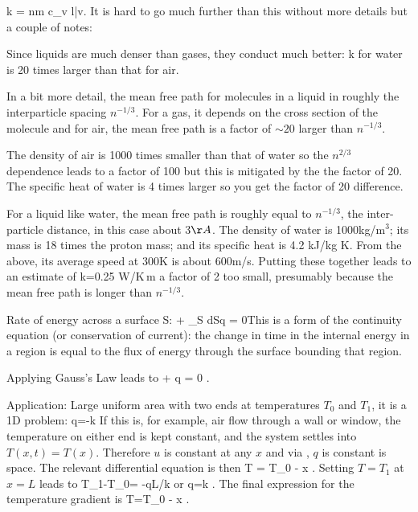 \documentclass[11pt]{book}
\begin{document}
%


\be
k =  nm c_v l\bar v.\ee
It is hard to go much further than this without more details but a couple of notes:
\bee
\item Since liquids are much denser than gases, they conduct much better: k for water is 20 times larger than that for air.
\item In a bit more detail, the mean free path for molecules in a liquid in roughly the interparticle spacing $n^{-1/3}$. For a gas, it depends on the cross section of the molecule and for air, the mean free path is a factor of $\sim 20$ larger than $n^{-1/3}$.
\item The density of air is 1000 times smaller than that of water so the $n^{2/3}$ dependence leads to a factor of 100 but this is mitigated by the the factor of 20. The specific heat of water is 4 times larger so you get the factor of 20 difference.
\item For a liquid like water, the mean free path is roughly equal to $n^{-1/3}$, the inter-particle distance, in this case about 3$\AA$. The density of water is 1000kg/m$^3$; its mass is 18 times the proton mass; and its specific heat is 4.2 kJ/kg K. From the above, its average speed at 300K is about 600m/s. Putting these together leads to an estimate of
\be
k=0.25 {\rm W/K\,m}\ee
a factor of 2 too small, presumably because the mean free path is longer than $n^{-1/3}$.
\eee


\bei
\item 
Rate of energy across a surface S: \be{} + \int_S d\vec S\cdot \vec q = 0\ee This is a form of the continuity equation (or conservation of current): the change in time in the internal energy in a region is equal to the flux of energy through the surface bounding that region.
\item Applying Gauss's Law leads to
\be
{} +  \nabla\cdot \vec q = 0
.\ee
\eei

Application: Large uniform area with two ends at temperatures $T_0$ and $T_1$, it is a 1D problem:
\be
q=-k
\ee
If this is, for example, air flow through a wall or window, the temperature on either end is kept constant, and the system settles into $T(x,t)=T(x)$. Therefore $u$ is constant at any $x$ and  via , $q$ is constant is space. The relevant differential equation is then
\be
T = T_0 - x
.\ee
Setting $T=T_1$ at $x=L$ leads to
\be
T_1-T_0= -qL/k \ee
or
\be
q=k 
.\ee
The final expression for the temperature gradient is
\be
T=T_0 - x .\ee
\end{document}
